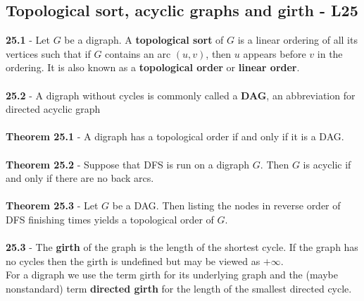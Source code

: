 \documentclass[a4paper]{article}
\begin{document}
\subsection*{Topological sort, acyclic graphs and girth - L25}
\textbf{25.1} - Let $G$ be a digraph. A \textbf{topological sort} of $G$ is a linear ordering of
all its vertices such that if $G$ contains an arc $(u, v)$, then $u$ appears before $v$ in the
ordering. It is also known as a \textbf{topological order} or \textbf{linear order}.\\\\
\textbf{25.2} - A digraph without cycles is commonly called a \textbf{DAG}, an abbreviation
for directed acyclic graph\\\\
\textbf{Theorem 25.1} - A digraph has a topological order if and only if it is a DAG.\\\\
\textbf{Theorem 25.2} - Suppose that DFS is run on a digraph $G$. Then $G$ is acyclic if and
only if there are no back arcs.\\\\
\textbf{Theorem 25.3} - Let $G$ be a DAG. Then listing the nodes in reverse order of DFS
finishing times yields a topological order of $G$.\\\\
\textbf{25.3} - The \textbf{girth} of the graph is the length of the shortest cycle. If the
graph has no cycles then the girth is undefined but may be viewed as $+\infty$.\\
For a digraph we use the term girth for its underlying graph and the (maybe nonstandard)
term \textbf{directed girth} for the length of the smallest directed cycle.
\end{document}
